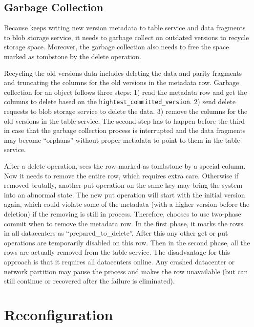 
\subsection{Garbage Collection}
Because {\name} keeps writing new version metadata to table service and data fragments
to blob storage service, it needs to garbage collect on outdated versions to recycle
storage space. Moreover, the garbage collection also needs to free the space marked as
tombstone by the delete operation.

Recycling the old versions data includes deleting the data and parity fragments and
truncating the columns for the old versions in the metadata row. Garbage collection
for an object follows three steps: 1) read the metadata row and get the columns to
delete based on the \texttt{hightest\_committed\_version}. 2) send delete requests to
blob storage service to delete the data. 3) remove the columns for the old versions
in the table service. The second step has to happen before the third in case that the
garbage collection process is interrupted and the data fragments may become ``orphans''
without proper metadata to point to them in the table service.

After a delete operation, {\name} sees the row marked as tombstone by a special column.
Now it needs to remove the entire row, which requires extra care. Otherwise if removed
brutally, another put operation on the same key may bring the system into an abnormal
state. The new put operation will start with the initial version again, which could
violate some of the metadata (with a higher version before the deletion) if the removing is still in
process. Therefore, {\name} chooses to use two-phase commit when to remove the metadata
row. In the first phase, it marks the rows in all datacenters as ``prepared\_to\_delete''.
After this any other get or put operations are temporarily disabled on this row. Then
in the second phase, all the rows are actually removed from the table service. The
disadvantage for this approach is that it requires all datacenters online. Any crashed
datacenter or network partition may pause the process and makes the row unavailable
(but can still continue or recovered after the failure is eliminated). 


\section{Reconfiguration}

